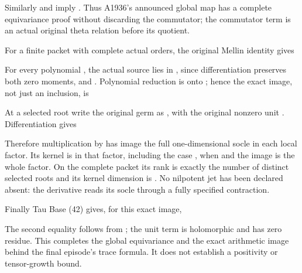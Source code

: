 
Similarly \protect{} and \protect{}
imply \protect{}. Thus A1936's announced global map
has a complete equivariance proof without discarding the commutator; the
commutator term is an actual original theta relation before its
quotient.

For a finite packet \protect{} with complete
actual orders, the original Mellin identity gives


For every polynomial \protect{}, the actual source
\protect{} lies in \protect{}, since
differentiation preserves both zero moments, and \protect{}.
Polynomial reduction is onto \protect{}; hence the exact image,
not just an inclusion, is


At a selected root write the original germ as
\protect{}, with the original nonzero unit
\protect{}. Differentiation gives


Therefore multiplication by \protect{} has image the full
one-dimensional socle \protect{} in each local factor.
Its kernel is \protect{} in that factor, including the case
\protect{}, when \protect{} and the image is the
whole factor. On the complete packet its rank is exactly the number of
distinct selected roots and its kernel dimension is
\protect{}. No nilpotent jet has been declared
absent: the derivative reads its socle through a fully specified
contraction.

Finally Tau Base (42) gives, for this exact image,


The second equality follows from
\protect{}; the unit term is holomorphic
and has zero residue. This completes the global equivariance and the
exact arithmetic image behind the final episode's trace formula. It does
not establish a positivity or tensor-growth bound.


